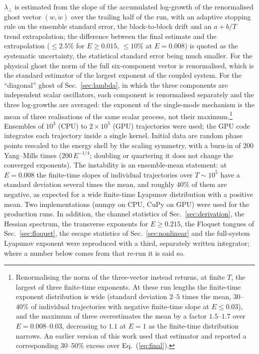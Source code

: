 \documentclass[11pt,a4paper]{article}
\begin{document}
$\lambda_\perp$ is estimated from the slope of the accumulated log-growth of the renormalised
ghost vector $(w,\dot w)$ over the trailing half of the run, with an adaptive stopping rule on
the ensemble standard error, the block-to-block drift and an $a+b/T$ trend extrapolation; the
difference between the final estimate and the extrapolation ($\le2.5\%$ for $E\ge0.015$,
$\le10\%$ at $E=0.008$) is quoted as the systematic uncertainty, the statistical standard error
being much smaller. For the physical ghost the norm of the full six-component vector is
renormalised, which is the standard estimator of the largest exponent of the coupled system. For
the ``diagonal'' ghost of Sec.~\ref{sec:lambda}, in which the three components are independent
scalar oscillators, each component is renormalised separately and the three log-growths are
averaged: the exponent of the single-mode mechanism is the mean of three realisations of the same
scalar process, not their maximum.\footnote{Renormalising the norm of the three-vector instead
returns, at finite $T$, the largest of three finite-time exponents. At these run lengths the
finite-time exponent distribution is wide (standard deviation $2$--$5$ times the mean,
$30$--$40\%$ of individual trajectories with negative finite-time slope at $E\le0.03$), and the
maximum of three overestimates the mean by a factor $1.5$--$1.7$ over $E=0.008$--$0.03$,
decreasing to $1.1$ at $E=1$ as the finite-time distribution narrows. An earlier version of this work used that estimator and reported a corresponding
$30$--$50\%$ excess over Eq.~(\ref{eq:final}).} Ensembles of
$10^3$ (CPU) to $2\times10^5$ (GPU) trajectories were used; the GPU code integrates each
trajectory inside a single kernel. Initial data are random phase points rescaled to the energy
shell by the scaling symmetry, with a burn-in of $200$ Yang--Mills times ($200\,E^{-1/4}$;
doubling or quartering it does not change the converged exponents). The instability is an
ensemble-mean statement: at $E=0.008$ the finite-time slopes of individual trajectories over
$T\sim10^5$ have a standard deviation several times the mean, and roughly $40\%$ of them are
negative, as expected for a wide finite-time Lyapunov distribution with a positive mean. Two
implementations (numpy on CPU, CuPy on GPU) were used for the production runs. In addition, the
channel statistics of Sec.~\ref{sec:derivation}, the Hessian spectrum, the transverse exponents
for $E\ge0.215$, the Floquet tongues of Sec.~\ref{sec:floquet}, the escape statistics of
Sec.~\ref{sec:nonlinear} and the full-system Lyapunov exponent were reproduced with a third,
separately written integrator; where a number below comes from that re-run it is said so.
\end{document}
